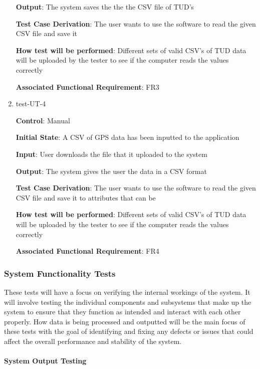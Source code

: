 \documentclass[12pt, titlepage]{article}
\begin{document}
\begin{enumerate}
\textbf{Output}: The system saves the the the CSV file of TUD's

\textbf{Test Case Derivation}: The user wants to use the software to read the given CSV file and save it
					
\textbf{How test will be performed}: Different sets of valid CSV's of TUD data will be uploaded by the tester to see if the computer reads the values correctly

\textbf{Associated Functional Requirement}: FR3

\item{test-UT-4\\}

\textbf{Control}: Manual 
					
\textbf{Initial State}: A CSV of GPS data has been inputted to the application
					
\textbf{Input}: User downloads the file that it uploaded to the system 
					
\textbf{Output}: The system gives the user the data in a CSV format 

\textbf{Test Case Derivation}: The user wants to use the software to read the given CSV file and save it to attributes that can be 
					
\textbf{How test will be performed}: Different sets of valid CSV's of TUD data will be uploaded by the tester to see if the computer reads the values correctly

\textbf{Associated Functional Requirement}: FR4
\end{enumerate}

\subsubsection{System Functionality Tests}

These tests will have a focus on verifying the internal workings of the system. It will involve testing the individual components and subsystems that make up the system to ensure that they function as intended and interact with each other properly. How data is being processed and outputted will be the main focus of these tests with the goal of identifying and fixing any defects or issues that could affect the overall performance and stability of the system.

\paragraph{System Output Testing}
\end{document}

